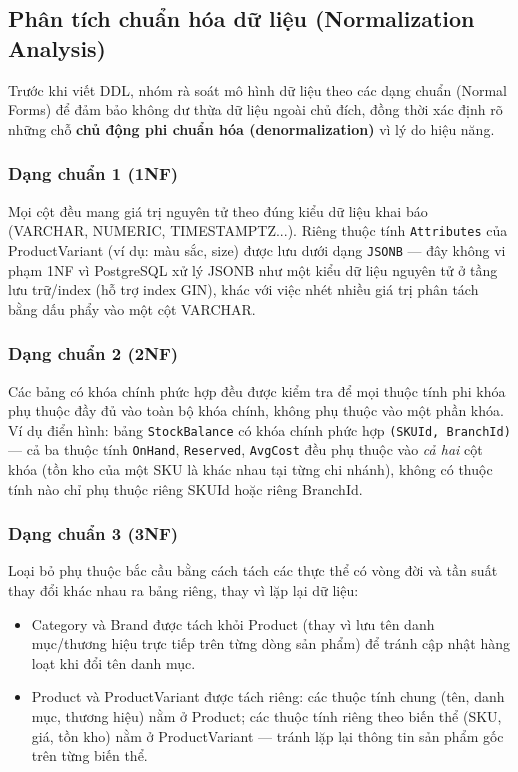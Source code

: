 \subsection{Phân tích chuẩn hóa dữ liệu (Normalization Analysis)}

Trước khi viết DDL, nhóm rà soát mô hình dữ liệu theo các dạng chuẩn (Normal Forms) để đảm bảo không dư thừa dữ liệu ngoài chủ đích, đồng thời xác định rõ những chỗ \textbf{chủ động phi chuẩn hóa (denormalization)} vì lý do hiệu năng.

\subsubsection{Dạng chuẩn 1 (1NF)}
Mọi cột đều mang giá trị nguyên tử theo đúng kiểu dữ liệu khai báo (VARCHAR, NUMERIC, TIMESTAMPTZ...). Riêng thuộc tính \texttt{Attributes} của ProductVariant (ví dụ: màu sắc, size) được lưu dưới dạng \texttt{JSONB} — đây không vi phạm 1NF vì PostgreSQL xử lý JSONB như một kiểu dữ liệu nguyên tử ở tầng lưu trữ/index (hỗ trợ index GIN), khác với việc nhét nhiều giá trị phân tách bằng dấu phẩy vào một cột VARCHAR.

\subsubsection{Dạng chuẩn 2 (2NF)}
Các bảng có khóa chính phức hợp đều được kiểm tra để mọi thuộc tính phi khóa phụ thuộc đầy đủ vào toàn bộ khóa chính, không phụ thuộc vào một phần khóa. Ví dụ điển hình: bảng \texttt{StockBalance} có khóa chính phức hợp \texttt{(SKUId, BranchId)} — cả ba thuộc tính \texttt{OnHand}, \texttt{Reserved}, \texttt{AvgCost} đều phụ thuộc vào \emph{cả hai} cột khóa (tồn kho của một SKU là khác nhau tại từng chi nhánh), không có thuộc tính nào chỉ phụ thuộc riêng SKUId hoặc riêng BranchId.

\subsubsection{Dạng chuẩn 3 (3NF)}
Loại bỏ phụ thuộc bắc cầu bằng cách tách các thực thể có vòng đời và tần suất thay đổi khác nhau ra bảng riêng, thay vì lặp lại dữ liệu:
\begin{itemize}
    \item Category và Brand được tách khỏi Product (thay vì lưu tên danh mục/thương hiệu trực tiếp trên từng dòng sản phẩm) để tránh cập nhật hàng loạt khi đổi tên danh mục.
    \item Product và ProductVariant được tách riêng: các thuộc tính chung (tên, danh mục, thương hiệu) nằm ở Product; các thuộc tính riêng theo biến thể (SKU, giá, tồn kho) nằm ở ProductVariant — tránh lặp lại thông tin sản phẩm gốc trên từng biến thể.
\end{itemize}

